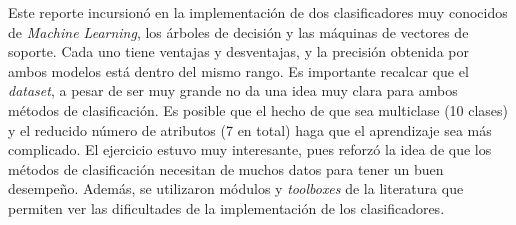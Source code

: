 \documentclass{llncs}
\begin{document}
Este reporte incursionó en la implementación de dos clasificadores muy conocidos de \textit{Machine Learning},
los árboles de decisión y las máquinas de vectores de soporte.
Cada uno tiene ventajas y desventajas, y la precisión obtenida por ambos modelos está dentro del mismo rango.
Es importante recalcar que el \textit{dataset}, a pesar de ser muy grande no da una idea muy clara para ambos métodos de clasificación.
Es posible que el hecho de que sea multiclase (10 clases) y el reducido número de atributos (7 en total) haga que el aprendizaje sea más complicado.
El ejercicio estuvo muy interesante, pues reforzó la idea de que los métodos de clasificación necesitan de muchos datos para tener un buen desempeño.
Además, se utilizaron módulos y \textit{toolboxes} de la literatura que permiten ver las dificultades de la implementación de los clasificadores.



\end{document}
